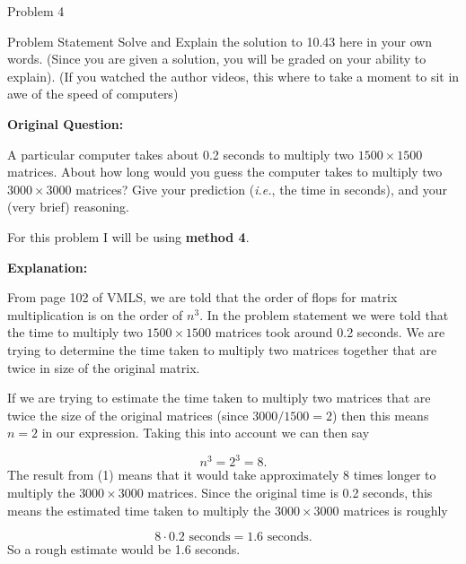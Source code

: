 \begin{problem}{Problem 4}
    \begin{statement}{Problem Statement}
        Solve and Explain the solution to 10.43 here in your own words. (Since you are given a solution, you will be graded on your ability to explain). (If you watched the author videos, this where 
        to take a moment to sit in awe of the speed of computers) \vspace*{1em}

        \noindent \textbf{Original Question:} \vspace*{1em}

        A particular computer takes about 0.2 seconds to multiply two $1500 \times 1500$ matrices. About how long would you guess the computer takes to multiply two $3000 \times 3000$ matrices? Give 
        your prediction (\textit{i.e.}, the time in seconds), and your (very brief) reasoning.
    \end{statement}

    \begin{Highlight}[Solution]
        \noindent For this problem I will be using \textbf{method 4}. \vspace*{1em}

        \noindent \textbf{Explanation:} \vspace*{1em}

        From page 102 of VMLS, we are told that the order of flops for matrix multiplication is on the order of $n^{3}$. In the problem statement we were told that the time to multiply two $1500 \times 1500$
        matrices took around 0.2 seconds. We are trying to determine the time taken to multiply two matrices together that are twice in size of the original matrix. 

        If we are trying to estimate the time taken to multiply two matrices that are twice the size of the original matrices (since $3000 / 1500 = 2$) then this means $n = 2$ in our expression. Taking
        this into account we can then say 
        
        \setcounter{equation}{0}
        \begin{equation}
            n^{3} = 2^{3} = 8.
        \end{equation}
        The result from (1) means that it would take approximately 8 times longer to multiply the $3000 \times 3000$ matrices. Since the original time is 0.2 seconds, this means the estimated time 
        taken to multiply the $3000 \times 3000$ matrices is roughly

        \begin{equation}
            8\cdot 0.2 \text{ seconds} = 1.6 \text{ seconds}.
        \end{equation}
        So a rough estimate would be 1.6 seconds.
    \end{Highlight}
\end{problem}

